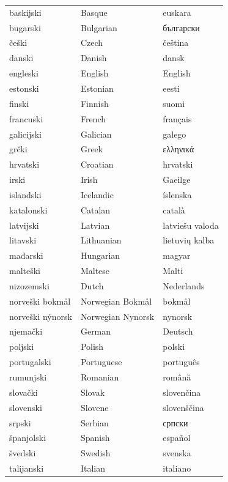 \vspace*{-5mm}
\centering
  \setlength{\tabcolsep}{2em}
  \begin{tabulary}{170mm}{LLL} \toprule
    baskijski & Basque & euskara \\
  bugarski & Bulgarian & български \\
  češki & Czech & čeština \\
  danski & Danish & dansk \\
  engleski & English & English \\
  estonski & Estonian & eesti \\
  finski & Finnish & suomi \\
  francuski & French & français \\
  galicijski & Galician & galego \\
  grčki & Greek & ελληνικά \\
  hrvatski & Croatian & hrvatski \\
  irski & Irish & Gaeilge \\
  islandski & Icelandic & íslenska \\
  katalonski & Catalan & català \\
  latvijski & Latvian & latviešu valoda \\
  litavski & Lithuanian & lietuvių kalba \\
  mađarski & Hungarian & magyar \\
  malteški & Maltese & Malti \\
  nizozemski & Dutch & Nederlands \\
  norveški bokmål & Norwegian Bokmål & bokmål \\
  norveški nýnorsk & Norwegian Nynorsk & nynorsk \\
  njemački & German & Deutsch \\  
  poljski & Polish & polski \\
  portugalski & Portuguese & português \\
  rumunjski & Romanian & română \\
  slovački & Slovak & slovenčina \\
  slovenski & Slovene & slovenščina \\
  srpski & Serbian & српски \\
  španjolski & Spanish & español \\
  švedski & Swedish & svenska \\
  talijanski & Italian & italiano \\ \bottomrule
\end{tabulary}


